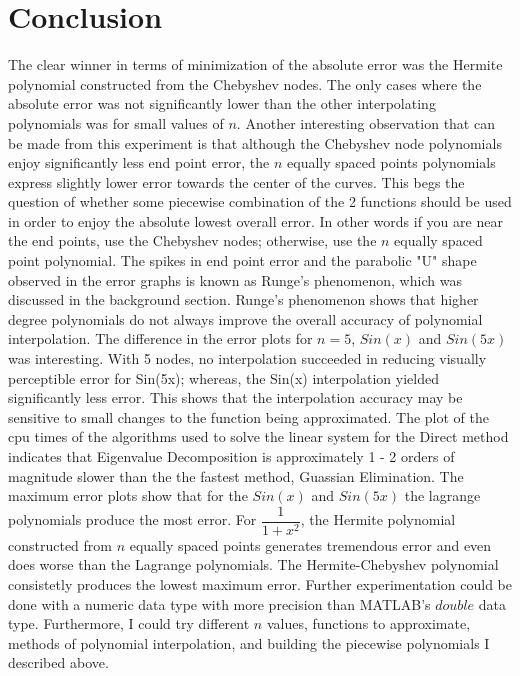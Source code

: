 \documentclass[11pt]{article}%
\begin{document}
\section*{Conclusion}
The clear winner in terms of minimization of the absolute error was the Hermite polynomial constructed from the Chebyshev nodes. The only cases where the absolute error was not significantly lower than the other interpolating polynomials was for small values of $n$. Another interesting observation that can be made from this experiment is that although the Chebyshev node polynomials enjoy significantly less end point error, the $n$ equally spaced points polynomials express slightly lower error towards the center of the curves. This begs the question of whether some piecewise combination of the 2 functions should be used in order to enjoy the absolute lowest overall error. In other words if you are near the end points, use the Chebyshev nodes; otherwise, use the $n$ equally spaced point polynomial. The spikes in end point error and the parabolic "U" shape observed in the error graphs is known as Runge's phenomenon, which was discussed in the background section.  Runge's phenomenon shows that higher degree polynomials do not always improve the overall accuracy of polynomial interpolation.  The difference in the error plots for $n = 5$, $Sin(x)$ and $Sin(5x)$ was interesting.  With 5 nodes, no interpolation succeeded in reducing visually perceptible error for Sin(5x); whereas, the Sin(x) interpolation yielded significantly less error.  This shows that the interpolation accuracy may be sensitive to small changes to the function being approximated.  The plot of the cpu times of the algorithms used to solve the linear system for the Direct method indicates that Eigenvalue Decomposition is approximately 1 - 2 orders of magnitude slower than the the fastest method, Guassian Elimination.  The maximum error plots show that for the $Sin(x)$ and $Sin(5x)$ the lagrange polynomials produce the most error.  For $\dfrac{1}{1+x^2}$, the Hermite polynomial constructed from $n$ equally spaced points generates tremendous error and even does worse than the Lagrange polynomials.  The Hermite-Chebyshev polynomial consistetly produces the lowest maximum error.   Further experimentation could be done with a numeric data type with more precision than MATLAB's $double$ data type. Furthermore, I could try different $n$ values, functions to approximate, methods of polynomial interpolation, and building the piecewise polynomials I described above.
\end{document}
